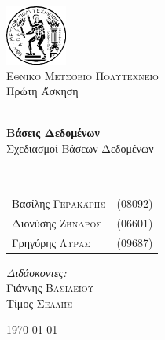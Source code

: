 \begin{titlepage}
\begin{center}

\includegraphics[width=0.15\textwidth]{title/Pyrforos2.png}\\[1.cm]
\textsc{\LARGE Εθνικό Μετσόβιο Πολυτεχνείο}\\[1.5cm]

\Large{ Πρώτη Άσκηση }\\[0.5cm]

\begin{doublespace}
\HRule \\[0.4cm]
{\huge \bfseries
Βάσεις Δεδομένων
}\\[0.4cm]
Σχεδιασμοί Βάσεων Δεδομένων\\
\end{doublespace}

\HRule \\[1.5cm]

\begin{minipage}{0.4\textwidth}
\begin{flushleft} \large
\begin{tabular}{l l}
Βασίλης \textsc{Γερακάρης} & (08092)\\
Διονύσης \textsc{Ζήνδρος} & (06601)\\
Γρηγόρης \textsc{Λύρας}	& (09687)\\
\end{tabular}
\end{flushleft}
\end{minipage}
\begin{minipage}{0.4\textwidth}
\begin{flushright} \large
\emph{Διδάσκοντες:} \\
Γιάννης \textsc{Βασιλείου}\\
Τίμος \textsc{Σελλής}
\end{flushright}
\end{minipage}

\vfill

{\large \today}
\end{center}
\end{titlepage}
